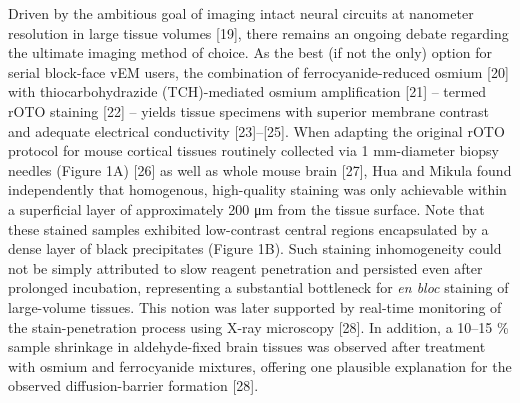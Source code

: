 \documentclass{article}
\begin{document}
\noindent Driven by the ambitious goal of imaging intact neural circuits at nanometer resolution in large tissue volumes [19], there remains an ongoing debate regarding the ultimate imaging method of choice. As the best (if not the only) option for serial block-face vEM users, the combination of ferrocyanide-reduced osmium [20] with thiocarbohydrazide (TCH)-mediated osmium amplification [21] – termed rOTO staining [22] – yields tissue specimens with superior membrane contrast and adequate electrical conductivity [23]–[25]. When adapting the original rOTO protocol for mouse cortical tissues routinely collected via 1 mm-diameter biopsy needles (Figure 1A) [26] as well as whole mouse brain [27], Hua and Mikula found independently that homogenous, high-quality staining was only achievable within a superficial layer of approximately 200 μm from the tissue surface. Note that these stained samples exhibited low-contrast central regions encapsulated by a dense layer of black precipitates (Figure 1B). Such staining inhomogeneity could not be simply attributed to slow reagent penetration and persisted even after prolonged incubation, representing a substantial bottleneck for \emph{en bloc} staining of large-volume tissues. This notion was later supported by real-time monitoring of the stain-penetration process using X-ray microscopy [28]. In addition, a 10–15 \% sample shrinkage in aldehyde-fixed brain tissues was observed after treatment with osmium and ferrocyanide mixtures, offering one plausible explanation for the observed diffusion-barrier formation [28].
\end{document}

